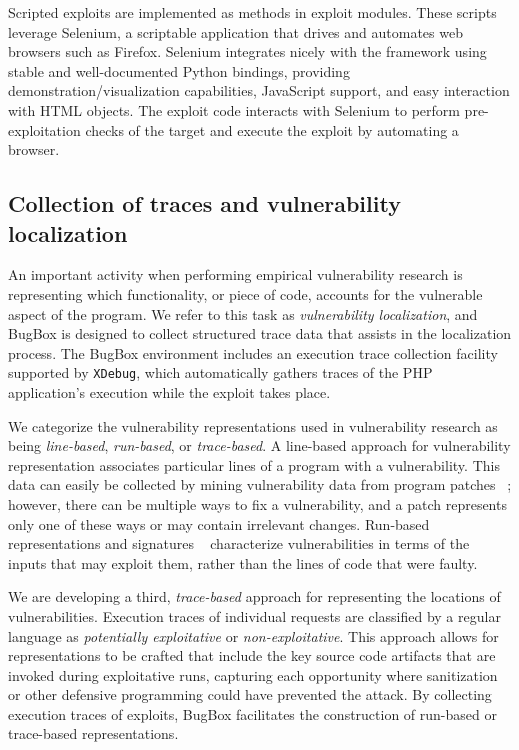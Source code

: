 \documentclass[letterpaper,twocolumn,10pt]{article}
\begin{document}
Scripted exploits are implemented as methods in exploit modules. These scripts leverage Selenium, a scriptable application that drives and automates web browsers such as Firefox. Selenium integrates nicely with the framework using stable and well-documented Python bindings, providing demonstration/visualization capabilities, JavaScript support, and easy interaction with HTML objects. The exploit code interacts with Selenium to perform pre-exploitation checks of the target and execute the exploit by automating a browser.

\subsection{Collection of traces and vulnerability localization}

An important activity when performing empirical vulnerability research is representing which functionality, or piece of code, accounts for the vulnerable aspect of the program. We refer to this task as \emph{vulnerability localization}, and BugBox is designed to collect structured trace data that assists in the localization process. The BugBox environment includes an execution trace collection facility supported by \texttt{XDebug}, which automatically gathers traces of the PHP application's execution while the exploit takes place.

We categorize the vulnerability representations used in vulnerability research as being \textit{line-based}, \textit{run-based}, or \textit{trace-based}. A line-based approach for vulnerability representation associates particular lines of a program with a vulnerability. This data can easily be collected by mining vulnerability data from program patches ~\cite{4630094}; however, there can be multiple ways to fix a vulnerability, and a patch represents only one of these ways or may contain irrelevant changes.  Run-based representations and signatures ~\cite{Song:2008:BNA:1496255.1496257} characterize vulnerabilities in terms of the inputs that may exploit them, rather than the lines of code that were faulty.

We are developing a third, \textit{trace-based} approach for representing the locations of vulnerabilities. Execution traces of individual requests are classified by a regular language as \emph{potentially exploitative} or \emph{non-exploitative}. This approach allows for representations to be crafted that include the key source code artifacts that are invoked during exploitative runs, capturing each opportunity where sanitization or other defensive programming could have prevented the attack. By collecting execution traces of exploits, BugBox facilitates the construction of run-based or trace-based representations.
\end{document}
